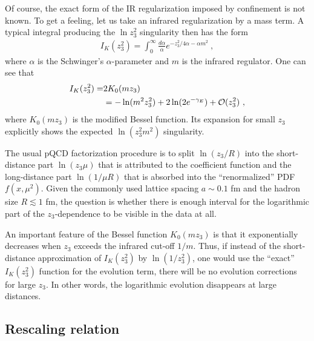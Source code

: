 \documentclass[aps,prd,twocolumn,showpacs,preprintnumbers,superscriptaddress]{revtex4-1}
\newcommand{\nn}{\nonumber \\ }
\begin{document}
 Of course, the exact form of the IR regularization  imposed  
by confinement is not known. To get  a feeling,
  let us take an infrared regularization by a  mass term.
 A typical integral producing the  $\ln z_3^2$  singularity then  has the form
   \begin{align} 
  I_K (z_3^2) = \int_0^\infty \frac{d\alpha}{\alpha} e^{-z_3^2/4\alpha -   \alpha m^2} \ ,
  \label{IK}
     \end{align} 
where $\alpha$ is the Schwinger's $\alpha$-parameter and $m$ is the infrared  regulator.  
 One can see that
   \begin{align} 
  I_K (z_3^2) = &2 K_0 (mz_3) \nn & = - \ln (m^2 z_3^2) + 2 \ln (2e^{-  \gamma_E })+ {\cal O} (z_3^2)  \  ,
  \label{Kexp} 
     \end{align} 
where $K_0(mz_3)$ is the modified Bessel function.  Its expansion for small $z_3$
explicitly  shows the expected $\ln (z_3^2 m^2)$ singularity.  


The usual pQCD factorization   procedure   is to split 
$\ln (z_3/ R)$ into the short-distance part $\ln (z_3 \mu)$   that is attributed  to  
the coefficient function  and the long-distance part $\ln ( 1/ \mu R )$
that is   absorbed into the ``renormalized'' PDF $f(x,\mu^2)$.
Given the commonly used   lattice   spacing $a\sim 0.1$ fm  and the hadron size
$R \lesssim 1$ fm, the question is whether  there is enough interval 
for the logarithmic part 
of the \mbox{$z_3$-dependence} to   be visible  in the  data  at all.

An important feature of the Bessel  function $K_0 (mz_3)$ is that it 
  exponentially decreases when 
$z_3$  exceeds the infrared cut-off $1/m$. 
Thus, if   instead of the  short-distance approximation of  
$I_K(z_3^2)$ by $\ln (1/z_3^2)$, 
one would use the ``exact'' $I_K(z_3^2)$ function  
for the evolution term, 
 there will be no evolution corrections for large $z_3$.
In other words, the logarithmic 
evolution disappears at large distances.   



\subsection{Rescaling relation} 
\end{document}
